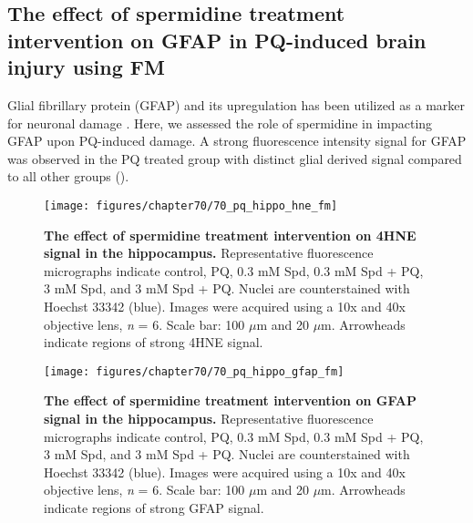 \subsection{The effect of spermidine treatment intervention on GFAP in PQ-induced brain injury using FM} 
Glial fibrillary protein (GFAP) and its upregulation has been utilized as a marker for neuronal damage \citep{Wu2015}. Here, we assessed the role of spermidine in impacting GFAP upon PQ-induced damage. A strong fluorescence intensity signal for GFAP was observed in the PQ treated group with distinct glial derived signal compared to all other groups ().

\begin{landscape}
\begin{figure}[!htbp]
\center
  \texttt{[image: figures/chapter70/70\_pq\_hippo\_hne\_fm]}
  \caption[The effect of spermidine treatment intervention on 4HNE signal in the hippocampus]{\textbf{The effect of spermidine treatment  intervention on 4HNE signal in the hippocampus.} Representative fluorescence micrographs indicate control, PQ, 0.3 mM Spd, 0.3 mM Spd + PQ, 3 mM Spd, and 3 mM Spd + PQ. Nuclei are counterstained with Hoechst 33342 (blue). Images were acquired using a 10x and 40x objective lens, \textit{n} = 6. Scale bar: 100 $\mu$m and 20 $\mu$m. Arrowheads indicate regions of strong 4HNE signal.}
  \label{fig:70_pq_hippo_hne_fm}
\end{figure} 
\end{landscape}

\begin{landscape}
\begin{figure}[!htbp]
\center
  \texttt{[image: figures/chapter70/70\_pq\_hippo\_gfap\_fm]}
  \caption[The effect of spermidine treatment intervention on GFAP signal in the hippocampus]{\textbf{The effect of spermidine treatment intervention on GFAP signal in the hippocampus.} Representative fluorescence micrographs indicate control, PQ, 0.3 mM Spd, 0.3 mM Spd + PQ, 3 mM Spd, and 3 mM Spd + PQ. Nuclei are counterstained with Hoechst 33342 (blue). Images were acquired using a 10x and 40x objective lens, \textit{n} = 6. Scale bar: 100 $\mu$m and 20 $\mu$m. Arrowheads indicate regions of strong GFAP signal.}
  \label{fig:70_pq_hippo_gfap_fm}
\end{figure} 
\end{landscape}


